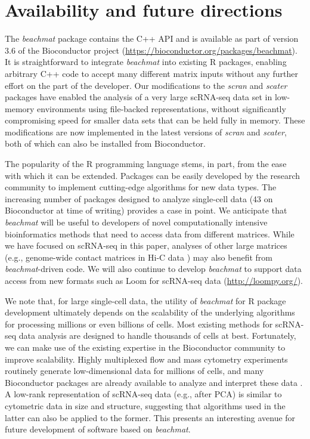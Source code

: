\documentclass[10pt,letterpaper]{article}
\newcommand{\beachmat}{\textit{beachmat}}
\begin{document}
\section*{Availability and future directions}
The \beachmat{} package contains the C++ API and is available as part of version 3.6 of the Bioconductor project (\url{https://bioconductor.org/packages/beachmat}).
It is straightforward to integrate \beachmat{} into existing R packages, enabling arbitrary C++ code to accept many different matrix inputs without any further effort on the part of the developer.
Our modifications to the \textit{scran} and \textit{scater} packages have enabled the analysis of a very large scRNA-seq data set in low-memory environments using file-backed representations, without significantly compromising speed for smaller data sets that can be held fully in memory.
These modifications are now implemented in the latest versions of \textit{scran} and \textit{scater}, both of which can also be installed from Bioconductor.

The popularity of the R programming language stems, in part, from the ease with which it can be extended.
Packages can be easily developed by the research community to implement cutting-edge algorithms for new data types.
The increasing number of packages designed to analyze single-cell data (43 on Bioconductor at time of writing) provides a case in point.
We anticipate that \beachmat{} will be useful to developers of novel computationally intensive bioinformatics methods that need to access data from different matrices.
While we have focused on scRNA-seq in this paper, analyses of other large matrices (e.g., genome-wide contact matrices in Hi-C data \cite{lun2016infrastructure}) may also benefit from \beachmat{}-driven code.
We will also continue to develop \beachmat{} to support data access from new formats such as Loom for scRNA-seq data (\url{http://loompy.org/}).

We note that, for large single-cell data, the utility of \beachmat{} for R package development ultimately depends on the scalability of the underlying algorithms for processing millions or even billions of cells.
Most existing methods for scRNA-seq data analysis are designed to handle thousands of cells at best.
Fortunately, we can make use of the existing expertise in the Bioconductor community to improve scalability.
Highly multiplexed flow and mass cytometry experiments routinely generate low-dimensional data for millions of cells,
and many Bioconductor packages are already available to analyze and interpret these data \cite{finak2014opencyto,weber2016comparison,lun2017testing}.
A low-rank representation of scRNA-seq data (e.g., after PCA) is similar to cytometric data in size and structure, suggesting that algorithms used in the latter can also be applied to the former.
This presents an interesting avenue for future development of software based on \beachmat{}.
\end{document}
